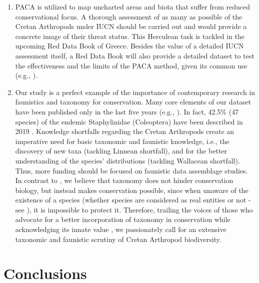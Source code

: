 \begin{enumerate}
    \item PACA is utilized to map uncharted areas and biota that suffer from reduced
conservational focus. A thorough assessment of as many as possible of the
Cretan Arthropods under IUCN should be carried out and would provide a concrete
image of their threat status. This Herculean task is tackled in the upcoming
Red Data Book of Greece. Besides the value of a detailed IUCN assessment itself,
a Red Data Book will also provide a detailed dataset to test the effectiveness
and the limits of the PACA method, given its common use (e.g., \textcite{iniesta2023where,kougioumoutzis2021extinction}).

    \item Our study is a perfect example of the importance of contemporary research in
faunistics and taxonomy for conservation. Many core elements of our dataset
have been published only in the last five years (e.g., \textcite{Assing_2019,salata2020review}).
In fact, 42.5\% (47 species) of the endemic Staphylinidae (Coleoptera) have
been described in 2019 \parencite{Assing_Brachat_Meybohm_2019}. Knowledge shortfalls \parencite{hortal2015seven}
regarding the Cretan Arthropods create an imperative need for basic taxonomic
and faunistic knowledge, i.e., the discovery of new taxa (tackling Linnean shortfall),
and for the better understanding of the species’ distributions (tackling Wallacean shortfall).
Thus, more funding should be focused on faunistic data assemblage studies.
In contrast to \textcite{garnett2017taxonomy}, we believe that taxonomy does not
hinder conservation biology, but instead makes conservation possible,
since when unaware of the existence of a species (whether species are
considered as real entities or not - see \textcite{raposo2017what}), it is impossible
to protect it. Therefore, trailing the voices of those who advocate for a
better incorporation of taxonomy in conservation \parencite{andreone2022reconnecting,boero2010the-study,carvalho2007taxonomic,dubois2003the-relationships} 
while acknowledging its innate value \parencite{engel2021the-taxonomic}, we passionately call
for an extensive taxonomic and faunistic scrutiny of Cretan Arthropod biodiversity.

\end{enumerate}

\section{Conclusions}
\label{sec:arthropods-conclusions}

